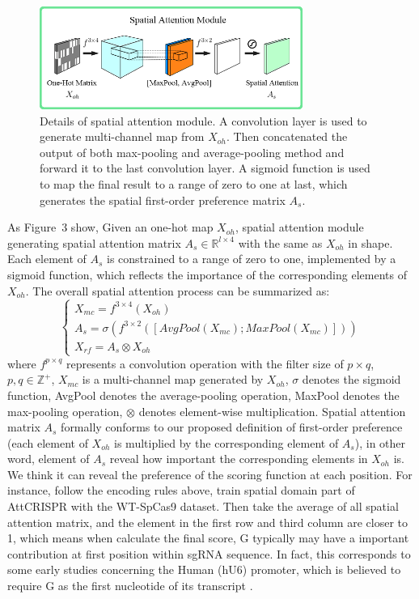 \documentclass{bioinfo}
\begin{document}
\begin{figure}[!tpb]%
    \centerline{\includegraphics[width=86mm]{spatialmodule.png}}
    \caption{Details of spatial attention module. A convolution layer is used to generate multi-channel map from $X_{oh}$.
    Then concatenated the output of both max-pooling and average-pooling method and forward it to the last convolution layer.
    A sigmoid function is used to map the final result to a range of zero to one at last, 
    which generates the spatial first-order preference matrix $A_s$.
    }\label{fig:03}
\end{figure}

As Figure~3\vphantom{\ref{fig:03}} show, Given an one-hot map $X_{oh}$, spatial attention module generating spatial attention matrix 
$A_s\in\mathbb{R}^{l\times 4}$ with the same as $X_{oh}$ in shape. 
Each element of $A_s$ is constrained to a range of zero to one, implemented by a sigmoid function, which reflects the importance of the corresponding elements of $X_{oh}$.
The overall spatial attention process can be summarized as:
\begin{equation}
\left\{\begin{array}{l}
X_{mc} = f^{3\times4}(X_{oh})
\\A_s = \sigma(f^{3\times2}([AvgPool(X_{mc});MaxPool(X_{mc})]))
\\X_{rf} = A_s\otimes X_{oh}
\end{array}\right.\label{eq:11}
\end{equation}
where $f^{p\times q}$ represents a convolution operation with the filter size of $p\times q$, 
$p,q\in\mathbb{Z}^{+}$, $X_{mc}$ is a multi-channel map generated by $X_{oh}$, $\sigma$ denotes the sigmoid function, 
AvgPool denotes the average-pooling operation, MaxPool denotes the max-pooling operation, $\otimes$ denotes element-wise multiplication.
Spatial attention matrix $A_s$ formally conforms to our proposed definition of first-order preference (each element of $X_{oh}$ is multiplied by the corresponding element of $A_s$), 
in other word, element of $A_s$ reveal how important the corresponding elements in $X_{oh}$ is. 
We think it can reveal the preference of the scoring function at each position. 
For instance, follow the encoding rules above, train spatial domain part of AttCRISPR with the WT-SpCas9 dataset. 
Then take the average of all spatial attention matrix, and the element in the first row and third column are closer to 1, which means when calculate the final score, 
G typically may have a important contribution at first position within sgRNA sequence. 
In fact, this corresponds to some early studies concerning the Human (hU6) promoter, which is believed to require G as the first nucleotide of its transcript \citep{cong2013multiplex,jinek2012a,mali2013rnaguided}.
\end{document}
